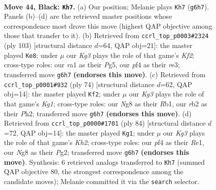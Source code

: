\documentclass[11pt]{article}
\begin{document}
\clearpage

\begin{figure}[p]\centering
\begin{subfigure}{0.46\textwidth}\centering
\resizebox{\linewidth}{!}{%
\newchessgame
\chessboard[
  setfen={2r2bn1/p5p1/P1b3k1/1p3p1p/1P3P2/4P1P1/1R5K/RNB5 b - - 3 44},
  showmover=false,
  pgfstyle=straightmove, color=movearrow, markmove={g6-h7}
]}
\caption{}
\end{subfigure}\hfill
\begin{subfigure}{0.46\textwidth}\centering
\resizebox{\linewidth}{!}{%
\newchessgame
\chessboard[
  setfen={3r1b2/5k2/1p2p2p/p3p1p1/4B1P1/P1P1R2P/1P3P2/4K3 b - - 26 52},
  showmover=false,
  pgfstyle=straightmove, color=movearrow, markmove={f7-e8}
]}
\caption{}
\end{subfigure}
\\[4pt]
\begin{subfigure}{0.46\textwidth}\centering
\resizebox{\linewidth}{!}{%
\newchessgame
\chessboard[
  setfen={1br5/pp3rkp/6p1/5p2/PB1P1P2/3BP3/6PP/1R4K1 w - - 0 38},
  showmover=false,
  pgfstyle=straightmove, color=movearrow, markmove={g1-f2}
]}
\caption{}
\end{subfigure}\hfill
\begin{subfigure}{0.46\textwidth}\centering
\resizebox{\linewidth}{!}{%
\newchessgame
\chessboard[
  setfen={1r6/1r4k1/3p2pn/R1pP1p1p/P4P1P/2P3B1/6PK/4R3 w - - 1 43},
  showmover=false,
  pgfstyle=straightmove, color=movearrow, markmove={h2-g1}
]}
\caption{}
\end{subfigure}
\caption{\textbf{Move 44, Black: \texttt{Kh7}.} (a) Our position; Melanie plays \texttt{Kh7} (\texttt{g6h7}). Panels (b)--(d) are the retrieved master positions whose correspondence most drove this move (highest QAP objective among those that transfer to it). (b) Retrieved from \texttt{ccrl\_top\_p0003\#2324} (ply 103) [structural distance $d$=64, QAP obj=21]: the master played \texttt{Ke8}; under $\mu$ our \emph{Kg3} plays the role of that game's \emph{Kf2}; cross-type roles: our \emph{r}a1 as their \emph{P}g5, our \emph{p}f4 as their \emph{r}e3; transferred move \texttt{g6h7} \textbf{(endorses this move)}. (c) Retrieved from \texttt{ccrl\_top\_p0001\#932} (ply 74) [structural distance $d$=62, QAP obj=14]: the master played \texttt{Kf2}; under $\mu$ our \emph{Kg3} plays the role of that game's \emph{Kg1}; cross-type roles: our \emph{N}g8 as their \emph{R}b1, our \emph{r}b2 as their \emph{P}h2; transferred move \texttt{g6h7} \textbf{(endorses this move)}. (d) Retrieved from \texttt{ccrl\_top\_p0000\#1701} (ply 84) [structural distance $d$=72, QAP obj=14]: the master played \texttt{Kg1}; under $\mu$ our \emph{Kg3} plays the role of that game's \emph{Kh2}; cross-type roles: our \emph{p}f4 as their \emph{R}e1, our \emph{N}g8 as their \emph{P}g2; transferred move \texttt{g6h7} \textbf{(endorses this move)}. Synthesis: 6 retrieved analogs transferred to \texttt{Kh7} (summed QAP objective 80, the strongest correspondence among the candidate moves); Melanie committed it via the \texttt{search} selector.}
\label{fig:thought-m87}
\end{figure}
\end{document}
